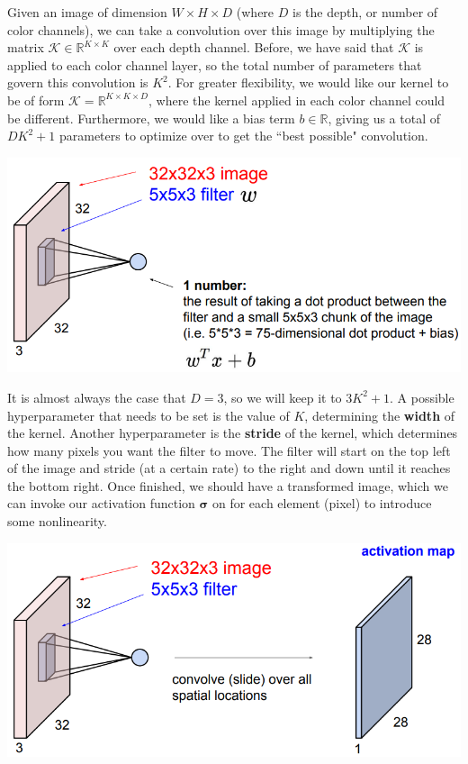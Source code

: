 \documentclass{article}
\theoremstyle{definition}
\theoremstyle{remark}
\theoremstyle{definition}
\begin{document}
Given an image of dimension $W \times H \times D$ (where $D$ is the depth, or number of color channels), we can take a convolution over this image by multiplying the matrix $\mathcal{K} \in \mathbb{R}^{K \times K}$ over each depth channel. Before, we have said that $\mathcal{K}$ is applied to each color channel layer, so the total number of parameters that govern this convolution is $K^2$. For greater flexibility, we would like our kernel to be of form $\mathcal{K} = \mathbb{R}^{K \times K \times D}$, where the kernel applied in each color channel could be different. Furthermore, we would like a bias term $b \in \mathbb{R}$, giving us a total of $DK^2 + 1$ parameters to optimize over to get the ``best possible" convolution. 
\begin{center}
    \includegraphics[scale=0.3]{Images/CNNs/kernel1.png}
\end{center}
It is almost always the case that $D = 3$, so we will keep it to $3K^2 + 1$. A possible hyperparameter that needs to be set is the value of $K$, determining the \textbf{width} of the kernel. Another hyperparameter is the \textbf{stride} of the kernel, which determines how many pixels you want the filter to move. The filter will start on the top left of the image and stride (at a certain rate) to the right and down until it reaches the bottom right. Once finished, we should have a transformed image, which we can invoke our activation function $\boldsymbol{\sigma}$ on for each element (pixel) to introduce some nonlinearity. 
\begin{center}
    \includegraphics[scale=0.3]{Images/CNNs/kernel2.png}
\end{center}
\end{document}

